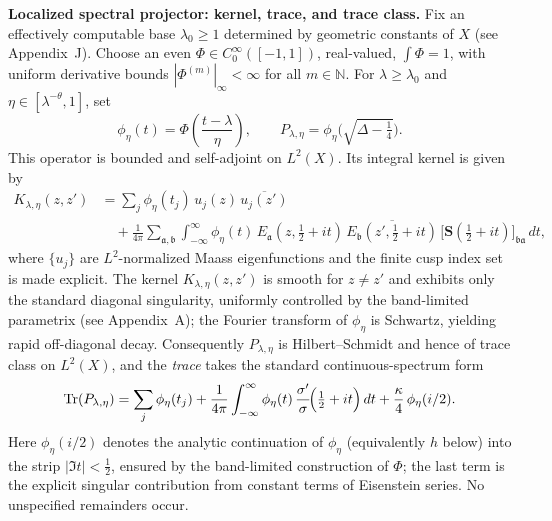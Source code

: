 \medskip
\noindent\textbf{Localized spectral projector: kernel, trace, and trace class.}
Fix an effectively computable base $\lambda_0\ge1$ determined by geometric constants of $X$ (see Appendix~J). Choose an even $\Phi\in C_0^\infty([-1,1])$, real-valued, $\int\Phi=1$, with uniform derivative bounds $|\Phi^{(m)}|_\infty<\infty$ for all $m\in\mathbb{N}$. For $\lambda\ge\lambda_0$ and $\eta\in[\lambda^{-\theta},1]$, set
\[
\phi_\eta(t)=\Phi\!\left(\frac{t-\lambda}{\eta}\right),\qquad 
P_{\lambda,\eta}=\phi_\eta\!\Big(\sqrt{\Delta-\tfrac14}\Big).
\]
This operator is bounded and self-adjoint on $L^2(X)$. Its integral kernel is given by
\begin{equation}\label{eq:kernel}
\begin{aligned}
K_{\lambda,\eta}(z,z') &= 
\sum_j \phi_\eta(t_j)\,u_j(z)\,\overline{u_j(z')} \\
&\quad+ \frac{1}{4\pi}\sum_{\mathfrak{a},\mathfrak{b}}
\int_{-\infty}^{\infty} \phi_\eta(t)\,E_\mathfrak{a}(z,\tfrac12+it)\,
\overline{E_\mathfrak{b}(z',\tfrac12+it)}\,
\big[\mathbf{S}(\tfrac12+it)\big]_{\mathfrak{b}\mathfrak{a}}\,dt,
\end{aligned}
\end{equation}
where $\{u_j\}$ are $L^2$-normalized Maass eigenfunctions and the finite cusp index set is made explicit. The kernel $K_{\lambda,\eta}(z,z')$ is smooth for $z\neq z'$ and exhibits only the standard diagonal singularity, uniformly controlled by the band-limited parametrix (see Appendix~A); the Fourier transform of $\phi_\eta$ is Schwartz, yielding rapid off-diagonal decay. Consequently $P_{\lambda,\eta}$ is Hilbert--Schmidt and hence of trace class on $L^2(X)$, and the \emph{trace} takes the standard continuous-spectrum form
\begin{equation}\label{eq:trace-decomp}
\operatorname{Tr}(P_{\lambda,\eta}) = 
\sum_j \phi_\eta(t_j) 
+ \frac{1}{4\pi}\int_{-\infty}^{\infty} 
\phi_\eta(t)\,\frac{\sigma'}{\sigma}\!\Big(\tfrac12+it\Big)\,dt
+ \frac{\kappa}{4}\,\phi_\eta(i/2).
\end{equation}
Here $\phi_\eta(i/2)$ denotes the analytic continuation of $\phi_\eta$ (equivalently $h$ below) into the strip $|\Im t|<\tfrac12$, ensured by the band-limited construction of $\Phi$; the last term is the explicit singular contribution from constant terms of Eisenstein series. No unspecified remainders occur.

